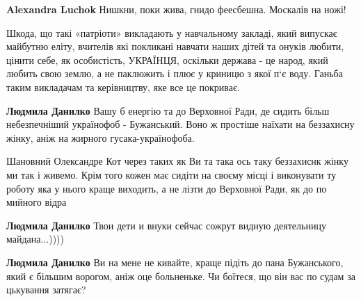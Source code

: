\begin{itemize}
\begin{itemize}

\textbf{Alexandra Luchok} Нишкни, поки жива, гнидо феесбешна. Москалів на ножі!

\end{itemize}



Шкода, що такі «патріоти» викладають у навчальному закладі, який випускає
майбутню еліту, вчителів які покликані навчати наших дітей та онуків любити,
цінити себе, як особистість, УКРАЇНЦЯ, оскільки держава - це народ, який любить
свою землю, а не паклюжить і плює у криницю з якої п‘є воду. Ганьба таким
викладачам та керівництву, яке все це покриває.

\begin{itemize}

\textbf{Людмила Данилко} Вашу б енергію та до Верховної Ради, де сидить більш небезпечніший українофоб - Бужанський. Воно ж простіше наїхати на беззахисну жінку, аніж на жирного гусака-українофоба.


Шановний Олександре Кот через таких як Ви та така ось таку беззахиснк жінку ми так і живемо. Крім того кожен має сидіти на своєму місці і виконувати ту роботу яка у нього краще виходить, а не лізти до Верховної Ради, як до по мийного відра


\textbf{Людмила Данилко} Твои дети и внуки сейчас сожрут видную деятельницу майдана...))))


\textbf{Людмила Данилко} Ви на мене не кивайте, краще підіть до пана Бужанського, який є більшим ворогом, аніж оце больненьке. Чи боїтеся, що він вас по судам за цькування затягає?



\end{itemize}
\end{itemize}
